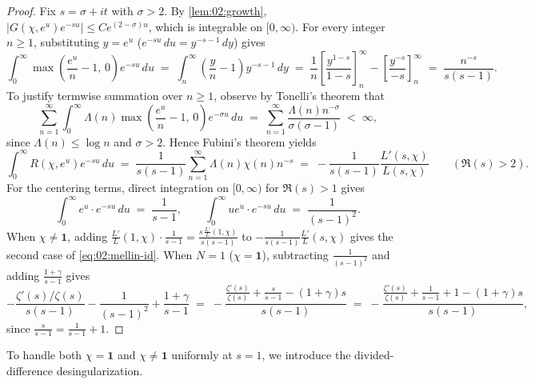 \begin{proof}
Fix $s = \sigma + it$ with $\sigma > 2$. By \cref{lem:02:growth}, $|G(\chi, e^u) e^{-su}| \le C e^{(2-\sigma)u}$, which is integrable on $[0, \infty)$. For every integer $n \ge 1$, substituting $y = e^u$ ($e^{-su}\,du = y^{-s-1}\,dy$) gives
\[
  \int_0^\infty \max\!\left(\frac{e^u}{n} - 1,\, 0\right) e^{-su}\,du
  \;=\; \int_n^\infty \left(\frac{y}{n} - 1\right) y^{-s-1}\,dy
  \;=\; \frac{1}{n}\left[\frac{y^{1-s}}{1-s}\right]_n^\infty - \left[\frac{y^{-s}}{-s}\right]_n^\infty
  \;=\; \frac{n^{-s}}{s(s-1)}.
\]
To justify termwise summation over $n \ge 1$, observe by Tonelli's theorem that
\[
  \sum_{n=1}^{\infty} \int_0^\infty \Lambda(n)\max\!\left(\frac{e^u}{n} - 1,\, 0\right) e^{-\sigma u}\,du
  \;=\; \sum_{n=1}^{\infty} \frac{\Lambda(n) n^{-\sigma}}{\sigma(\sigma - 1)} \;<\; \infty,
\]
since $\Lambda(n) \le \log n$ and $\sigma > 2$. Hence Fubini's theorem yields
\[
  \int_0^\infty R(\chi, e^u) e^{-su}\,du \;=\; \frac{1}{s(s-1)}\sum_{n=1}^\infty \Lambda(n)\chi(n) n^{-s}
  \;=\; -\frac{1}{s(s-1)}\frac{L'(s,\chi)}{L(s,\chi)} \qquad (\Re(s) > 2).
\]
For the centering terms, direct integration on $[0, \infty)$ for $\Re(s) > 1$ gives
\[
  \int_0^\infty e^u \cdot e^{-su}\,du \;=\; \frac{1}{s-1}, \qquad
  \int_0^\infty u e^u \cdot e^{-su}\,du \;=\; \frac{1}{(s-1)^2}.
\]
When $\chi \neq \mathbf{1}$, adding $\frac{L'}{L}(1,\chi)\cdot \frac{1}{s-1} = \frac{s\,\frac{L'}{L}(1,\chi)}{s(s-1)}$ to $-\frac{1}{s(s-1)}\frac{L'}{L}(s,\chi)$ gives the second case of \eqref{eq:02:mellin-id}. When $N = 1$ ($\chi = \mathbf{1}$), subtracting $\frac{1}{(s-1)^2}$ and adding $\frac{1+\gamma}{s-1}$ gives
\[
  -\frac{\zeta'(s)/\zeta(s)}{s(s-1)} - \frac{1}{(s-1)^2} + \frac{1+\gamma}{s-1}
  \;=\; -\frac{\frac{\zeta'(s)}{\zeta(s)} + \frac{s}{s-1} - (1+\gamma)s}{s(s-1)}
  \;=\; -\frac{\frac{\zeta'(s)}{\zeta(s)} + \frac{1}{s-1} + 1 - (1+\gamma)s}{s(s-1)},
\]
since $\frac{s}{s-1} = \frac{1}{s-1} + 1$.
\end{proof}

To handle both $\chi = \mathbf{1}$ and $\chi \neq \mathbf{1}$ uniformly at $s = 1$, we introduce the divided-difference desingularization.

